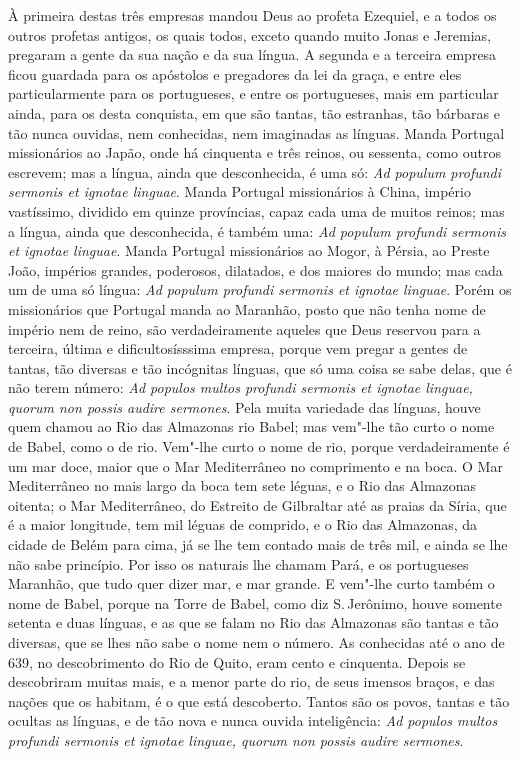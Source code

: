 À primeira destas três empresas mandou Deus ao profeta Ezequiel, e a
todos os outros profetas antigos, os quais todos, exceto quando muito
Jonas e Jeremias, pregaram a gente da sua nação e da sua língua. A
segunda e a terceira empresa ficou guardada para os apóstolos e
pregadores da lei da graça, e entre eles particularmente para os
portugueses, e entre os portugueses, mais em particular ainda, para os
desta conquista, em que são tantas, tão estranhas, tão bárbaras e tão
nunca ouvidas, nem conhecidas, nem imaginadas as línguas. Manda Portugal
missionários ao Japão, onde há cinquenta e três reinos, ou sessenta,
como outros escrevem; mas a língua, ainda que desconhecida, é uma só:
\emph{Ad populum profundi sermonis et ignotae linguae}. Manda Portugal
missionários à China, império vastíssimo, dividido em quinze províncias,
capaz cada uma de muitos reinos; mas a língua, ainda que desconhecida, é
também
uma: \emph{Ad populum profundi sermonis et ignotae linguae}. Manda
Portugal missionários ao Mogor, à Pérsia, ao Preste João, impérios
grandes, poderosos, dilatados, e dos maiores do mundo; mas cada um de
uma só língua: \emph{Ad populum profundi sermonis et ignotae linguae}.
Porém os missionários que Portugal manda ao Maranhão, posto que não
tenha nome de império nem de reino, são verdadeiramente aqueles que Deus
reservou para a terceira, última e dificultosísssima empresa, porque vem
pregar a gentes de tantas, tão diversas e tão incógnitas línguas, que só
uma coisa se sabe delas, que é não terem número: \emph{Ad populos multos
profundi sermonis et ignotae linguae, quorum non possis audire
sermones}.
Pela muita variedade das línguas, houve quem chamou ao Rio das Almazonas
rio Babel; mas vem"-lhe tão curto o nome de Babel, como o de rio. Vem"-lhe
curto o nome de rio, porque verdadeiramente é um mar doce, maior que o
Mar Mediterrâneo no comprimento e na boca. O Mar Mediterrâneo no mais
largo da boca tem sete léguas, e o Rio das Almazonas oitenta; o Mar
Mediterrâneo, do Estreito de Gilbraltar até as praias da Síria, que é a
maior longitude, tem mil léguas de comprido, e o Rio das Almazonas, da
cidade de Belém para cima, já se lhe tem contado mais de três mil, e
ainda se lhe não sabe princípio. Por isso os naturais lhe chamam Pará, e
os portugueses Maranhão, que tudo quer dizer mar, e mar grande. E
vem"-lhe curto também o nome de Babel, porque na Torre de Babel, como diz
S.\,Jerônimo, houve somente setenta e duas línguas, e as que se falam no
Rio das Almazonas são tantas e tão diversas, que se lhes não sabe o nome
nem o número. As conhecidas até o ano de 639, no descobrimento do Rio de
Quito, eram cento e cinquenta. Depois se descobriram muitas mais, e a
menor parte do rio, de seus imensos braços, e das nações que os habitam,
é o que está descoberto. Tantos são os povos, tantas e tão ocultas as
línguas, e de tão nova e nunca ouvida inteligência: \emph{Ad populos
multos profundi sermonis et ignotae linguae, quorum non possis audire
sermones}.

